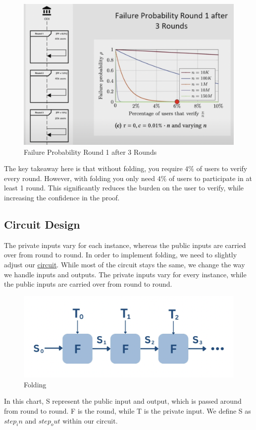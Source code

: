 \begin{figure}[H]
   \centering
   \includegraphics[width=130mm]{FailureProbabilityRound3.png}
   \caption{Failure Probability Round 1 after 3 Rounds \cite{NS23}}
   \label{overflow}
   \end{figure}
The key takeaway here is that without folding, you require $4\%$ of users to verify every round. However, with folding you only need
$4\%$  of users to participate in at least 1 round. This significantly reduces the burden on the user to verify, while increasing the confidence in the proof.


\subsection{Circuit Design}
The private inputs vary for each instance, whereas the public inputs are carried over from round to round.
In order to implement folding, we need to slightly adjust our \hyperref[subsec:pi]{circuit}. While most of the circuit stays the same, we change the way we handle inputs and outputs.
The private inputs vary for every instance, while the public inputs are carried over from round to round.
\begin{figure}[H]
   \centering
   \includegraphics[width=130mm]{FoldingCircuit.png}
   \caption{Folding \cite{VRS23}}
   \label{overflow}
   \end{figure}
In this chart, S represent the public input and output, which is passed around from round to round. F is the round, while T is the private input.
We define S as $step_in$ and $step_out$ within our circuit.


